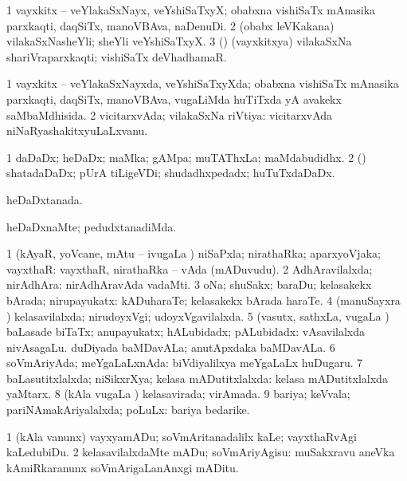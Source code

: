 \bentry
{}
\gl{\nA}
\bmng
\bnum
\num{1} vayxkitx -- veYlakaSxNayx, veYshiSaTxyX; obabxna vishiSaTx mAnasika parxkaqti, daqSiTx, manoVBAva, naDenuDi. 
\num{2} (obabx leVKakana) vilakaSxNasheYli; sheYli veYshiSaTxyX. 
\num{3} (\veYshA) (vayxkitxya) vilakaSxNa shariVraparxkaqti; vishiSaTx deVhadhamaR. 
\enum
\emng
\eentry

\bentry
{}
\gl{\gu}
\bmng
\bnum
\num{1} vayxkitx -- veYlakaSxNayxda, veYshiSaTxyXda; obabxna vishiSaTx mAnasika parxkaqti, daqSiTx, manoVBAva, \mo vugaLiMda huTiTxda yA avakekx saMbaMdhisida. 
\num{2} vicitarxvAda; vilakaSxNa riVtiya:  vicitarxvAda niNaRyashakitxyuLaLxvanu. 
\enum
\emng
\eentry

\bentry
{}
\gl{\nA}
\bmng
\bnum
\num{1} daDaDx; heDaDx; maMka; gAMpa; muTAThxLa; maMdabudidhx. 
\num{2} (\AmA) shatadaDaDx; pUrA tiLigeVDi; shudadhxpedadx; huTuTxdaDaDx. 
\enum
\emng
\eentry

\bentry
{}
\gl{\gu}
\bmng
heDaDxtanada. 
\emng
\eentry

\bentry
{}
\gl{\kirxvi}
\bmng
heDaDxnaMte; pedudxtanadiMda. 
\emng
\eentry

\bentry
{}
\gl{\gu}
\bmng
\bnum
\num{1} (kAyaR, yoVcane, mAtu -- ivugaLa \vi) niSaPxla; nirathaRka; aparxyoVjaka; vayxthaR:  vayxthaR, nirathaRka -- vAda (mADuvudu). 
\num{2} AdhAravilalxda; nirAdhAra:  nirAdhAravAda vadaMti. 
\num{3} oNa; shuSakx; baraDu; kelasakekx bArada; nirupayukatx:  kADuharaTe; kelasakekx bArada haraTe. 
\num{4} (manuSayxra \vi) kelasavilalxda; nirudoyxVgi; udoyxVgavilalxda. 
\num{5} (vasutx, sathxLa, \mo vugaLa \vi) baLasade biTaTx; anupayukatx; hALubidadx; pALubidadx:  vAsavilalxda nivAsagaLu.  duDiyada baMDavALa; anutApxdaka baMDavALa. 
\num{6} soVmAriyAda; meYgaLaLxnAda:  biVdiyalilxya meYgaLaLx huDugaru. 
\num{7} baLasutitxlalxda; niSikxrXya; kelasa mADutitxlalxda:  kelasa mADutitxlalxda yaMtarx. 
\num{8} (kAla \mo vugaLa \vi) kelasavirada; virAmada. 
\num{9} bariya; keVvala; pariNAmakAriyalalxda; poLuLx:  bariya bedarike. 
\enum
\emng
\eentry

\bentry
{}
\gl{\sakirx}
\bmng
\bnum
\num{1} (kAla \mo vanunx) vayxyamADu; soVmAritanadalilx kaLe; vayxthaRvAgi kaLedubiDu. 
\num{2} kelasavilalxdaMte mADu; soVmAriyAgisu:  muSakxravu aneVka kAmiRkaranunx soVmArigaLanAnxgi mADitu. 
\enum
\emng

